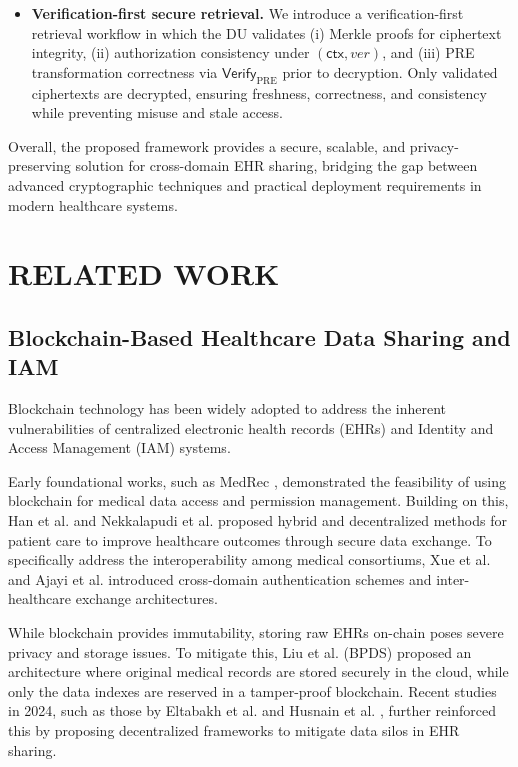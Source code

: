 \documentclass[conference]{IEEEtran}
\begin{document}
\begin{itemize}
\item \textbf{Verification-first secure retrieval.}  
We introduce a verification-first retrieval workflow in which the DU validates (i) Merkle proofs for ciphertext integrity, (ii) authorization consistency under $(\mathsf{ctx},ver)$, and (iii) PRE transformation correctness via $\textsf{Verify}_{\mathrm{PRE}}$ prior to decryption. Only validated ciphertexts are decrypted, ensuring freshness, correctness, and consistency while preventing misuse and stale access.

\end{itemize}


\vspace{0.5em}
\noindent
Overall, the proposed framework provides a secure, scalable, and privacy-preserving solution for cross-domain EHR sharing, bridging the gap between advanced cryptographic techniques and practical deployment requirements in modern healthcare systems.



\medskip
\section{RELATED WORK}

\subsection{Blockchain-Based Healthcare Data Sharing and IAM} 
Blockchain technology has been widely adopted to address the inherent vulnerabilities of centralized electronic health records (EHRs) and Identity and Access Management (IAM) systems.
\medskip

Early foundational works, such as MedRec \cite{b1}, demonstrated the feasibility of using blockchain for medical data access and permission management. Building on this, Han et al. \cite{b2} and Nekkalapudi et al. \cite{b4} proposed hybrid and decentralized methods for patient care to improve healthcare outcomes through secure data exchange. To specifically address the interoperability among medical consortiums, Xue et al. \cite{b3} and Ajayi et al. \cite{b5} introduced cross-domain authentication schemes and inter-healthcare exchange architectures.
\medskip

While blockchain provides immutability, storing raw EHRs on-chain poses severe privacy and storage issues. To mitigate this, Liu et al. (BPDS) \cite{b11} proposed an architecture where original medical records are stored securely in the cloud, while only the data indexes are reserved in a tamper-proof blockchain. Recent studies in 2024, such as those by Eltabakh et al. \cite{b20} and Husnain et al. \cite{b21}, further reinforced this by proposing decentralized frameworks to mitigate data silos in EHR sharing.
\medskip
\end{document}
